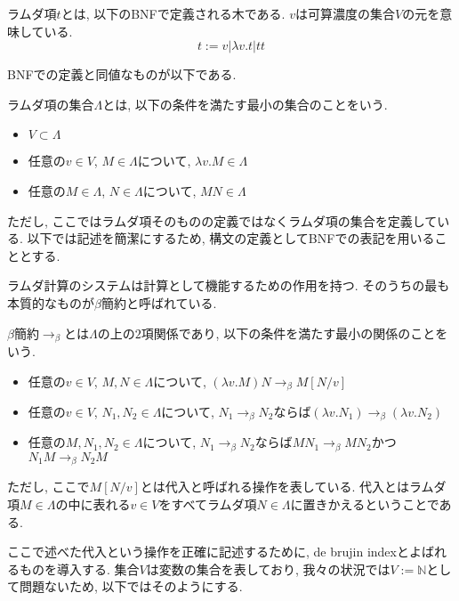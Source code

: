 \documentclass[12pt]{ltjsarticle}
\begin{document}
\begin{defn}
 ラムダ項$t$とは, 以下のBNFで定義される木である. $v$は可算濃度の集合$V$の元を意味している.
 \[
 t := v | \lambda v. t | t t
 \]
\end{defn}

BNFでの定義と同値なものが以下である.

\begin{defn}
 ラムダ項の集合$\Lambda$とは, 以下の条件を満たす最小の集合のことをいう.
 \begin{itemize}
  \item $V \subset \Lambda$
  \item 任意の$v \in V$, $M \in \Lambda$について, $\lambda v. M \in \Lambda$
  \item 任意の$M \in \Lambda$, $N \in \Lambda$について, $M N \in \Lambda$
 \end{itemize}
\end{defn}

ただし, ここではラムダ項そのものの定義ではなくラムダ項の集合を定義している. 以下では記述を簡潔にするため, 構文の定義としてBNFでの表記を用いることとする.

ラムダ計算のシステムは計算として機能するための作用を持つ. そのうちの最も本質的なものが$\beta$簡約と呼ばれている.

\begin{defn}
 $\beta$簡約$\rightarrow_{\beta}$とは$\Lambda$の上の$2$項関係であり, 以下の条件を満たす最小の関係のことをいう.
 \begin{itemize}
  \item 任意の$v \in V$, $M, N \in \Lambda$について, $(\lambda v. M) N \rightarrow_\beta M[N/v]$
  \item 任意の$v \in V$, $N_1, N_2 \in \Lambda$について, $N_1 \rightarrow_\beta N_2$ならば$(\lambda v. N_1) \rightarrow_\beta (\lambda v. N_2)$
  \item 任意の$M, N_1, N_2 \in \Lambda$について, $N_1 \rightarrow_\beta N_2$ならば$M N_1 \rightarrow_\beta M N_2$かつ$N_1 M \rightarrow_\beta N_2 M$
 \end{itemize}
 ただし, ここで$M[N/v]$とは代入と呼ばれる操作を表している. 代入とはラムダ項$M \in \Lambda$の中に表れる$v \in V$をすべてラムダ項$N \in \Lambda$に置きかえるということである.
\end{defn}

ここで述べた代入という操作を正確に記述するために, de brujin indexとよばれるものを導入する.
集合$V$は変数の集合を表しており, 我々の状況では$V := \mathbb{N}$として問題ないため, 以下ではそのようにする.
\end{document}
